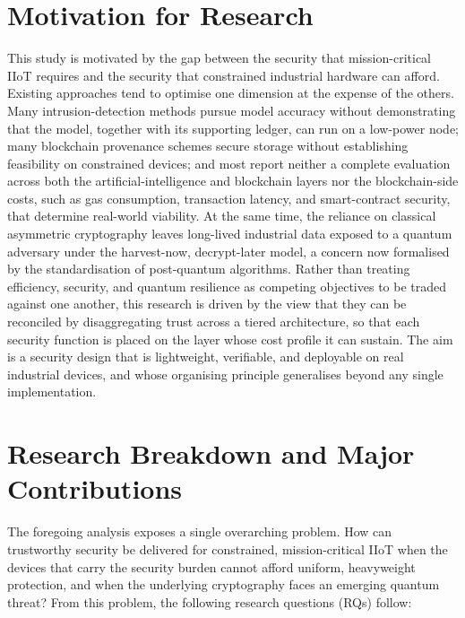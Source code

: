 \section{Motivation for Research}
\label{motivation}

This study is motivated by the gap between the security that mission-critical
IIoT requires and the security that constrained industrial hardware can afford.
Existing approaches tend to optimise one dimension at the expense of the others.
Many intrusion-detection methods pursue model accuracy without demonstrating
that the model, together with its supporting ledger, can run on a low-power node;
many blockchain provenance schemes secure storage without establishing
feasibility on constrained devices; and most report neither a complete
evaluation across both the artificial-intelligence and blockchain layers nor the
blockchain-side costs, such as gas consumption, transaction latency, and
smart-contract security, that determine real-world viability. At the same time,
the reliance on classical asymmetric cryptography leaves long-lived industrial
data exposed to a quantum adversary under the harvest-now, decrypt-later model,
a concern now formalised by the standardisation of post-quantum algorithms.
Rather than treating efficiency, security, and quantum resilience as competing
objectives to be traded against one another, this research is driven by the view
that they can be reconciled by disaggregating trust across a tiered architecture,
so that each security function is placed on the layer whose cost profile it can
sustain. The aim is a security design that is lightweight, verifiable, and
deployable on real industrial devices, and whose organising principle
generalises beyond any single implementation.

\section{Research Breakdown and Major Contributions}
\label{sec:rq}

The foregoing analysis exposes a single overarching problem. How can trustworthy
security be delivered for constrained, mission-critical IIoT when the devices
that carry the security burden cannot afford uniform, heavyweight protection,
and when the underlying cryptography faces an emerging quantum threat? From this
problem, the following research questions (RQs) follow:

